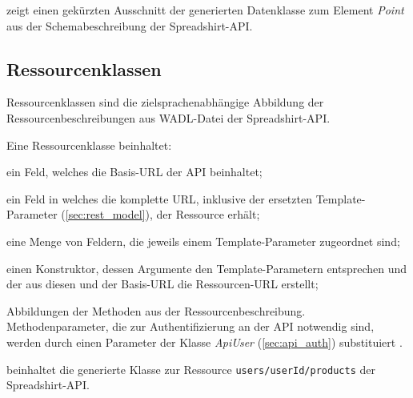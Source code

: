  zeigt einen gekürzten Ausschnitt der generierten Datenklasse zum Element \emph{Point} aus der Schemabeschreibung der Spreadshirt-\gls{API}.

\subsection{Ressourcenklassen}
\label{sec:ressourceclasses}

Ressourcenklassen sind die zielsprachenabhängige Abbildung der Ressourcenbeschreibungen aus WADL-Datei der Spreadshirt-\gls{API}.

Eine Ressourcenklasse beinhaltet:
\begin{compactitem}
    \item[\ding{202}] ein Feld, welches die Basis-\gls{URL} der API beinhaltet;
    \item[\ding{203}] ein Feld in welches die komplette \gls{URL}, inklusive der ersetzten Template-Parameter (\cref{sec:rest_model}), der Ressource erhält;
    \item[\ding{204}] eine Menge von Feldern, die jeweils einem Template-Parameter zugeordnet sind;
    \item[\ding{205}] einen Konstruktor, dessen Argumente den Template-Parametern entsprechen und der aus diesen und der Basis-\gls{URL} die Ressourcen-\gls{URL} erstellt;
    \item[\ding{206}] Abbildungen der Methoden aus der Ressourcenbeschreibung. Methodenparameter, die zur Authentifizierung an der \gls{API} notwendig sind, werden durch einen Parameter der Klasse \emph{ApiUser} (\cref{sec:api_auth}) substituiert .
\end{compactitem}

 beinhaltet die generierte Klasse zur Ressource \texttt{users/{userId}/products} der Spreadshirt-\gls{API}.

